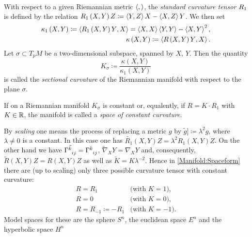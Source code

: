 \documentclass[../main.tex]{subfiles}
\begin{document}
\begin{definition}
With respect to a given Riemannian metric $\left\langle{},{}\right\rangle$,
the \textit{standard curvature tensor} $\tensor{{R_1}}{}$ is defined by the relation
$R_1\left(X,Y\right)Z\coloneqq\left\langle{Y},{Z}\right\rangle X-\left\langle{X},{Z}\right\rangle Y$.
We then set
\begin{align*}
\kappa_1\left(X,Y\right)
\coloneqq\left\langle{R_1\left(X,Y\right)Y},{X}\right\rangle
=\left\langle{X},{X}\right\rangle\left\langle{Y},{Y}\right\rangle-\left\langle{X},{Y}\right\rangle^2\text{,}\\
\kappa\left(X,Y\right)
\coloneqq\left\langle{R\left(X,Y\right)Y},{X}\right\rangle\text{.}
\end{align*}
Let $\sigma\subset T_pM$ be a two-dimensional subspace, spanned by $X$, $Y$.
Then the quantity
\begin{equation*}
K_\sigma
\coloneqq
\frac{\kappa\left(X,Y\right)}{\kappa_1\left(X,Y\right)}
\end{equation*}
is called the \textit{sectional curvature} of the Riemannian manifold with respect to the plane $\sigma$.
\end{definition}
\begin{definition}\label{Manifold:Spaceform}
If on a Riemannian manifold $K_\sigma$ is constant
or, equalently,
if $R=K\cdot R_1$ with $K\in\mathbb{R}$,
the manifold is called a \textit{space of constant curvature}.
\end{definition}
\begin{remark}
By \textit{scaling} one means the process of
replacing a metric $g$ by $\tilde{g}]\coloneqq\lambda^2g$, where $\lambda\ne0$ is a constant.
In this case one has $\tilde{R_1}\left(X,Y\right)Z=\lambda^2R_1\left(X,Y\right)Z$.
On the other hand we have
$\tilde{\tensor{\Gamma}{^k_i_j}}=\tensor{\Gamma}{^k_i_j}$,
$\tilde{\nabla}_XY=\nabla_XY$ and, consequently,
$\tilde{R}\left(X,Y\right)Z=R\left(X,Y\right)Z$
as well as $\tilde{K}=K\lambda^{-2}$.
Hence in \cref{Manifold:Spaceform} there are (up to scaling) only three possible curvature tensor with constant curvature:
\begin{align*}
R=R_1&\text{(with $K=1$),}\\
R=0&\text{(with $K=0$),}\\
R=R_{-1}\coloneqq-R_1&\text{(with $K=-1$).}
\end{align*}
Model spaces for these are the sphere $S^n$, the euclidean space $E^n$ and the hyperbolic space $H^n$
\end{remark}
\end{document}
